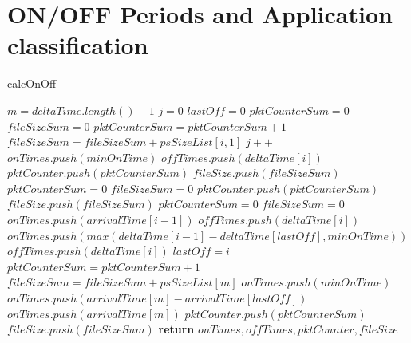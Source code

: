 \section{ON/OFF Periods and Application classification}

    
\begin{algorithm}[ht!]
    \caption{calcOnOff}
    \label{alg:calcOnOff}
    \begin{algorithmic}[1]
        \small
        \State $m = deltaTime.length() - 1$
        \State $j = 0$
        \State $lastOff = 0$
        \State $pktCounterSum = 0$
        \State $fileSizeSum = 0$
        \State $pktCounterSum = pktCounterSum + 1$
        \State $fileSizeSum = fileSizeSum + psSizeList[i, 1]$
         
        \State $j++$
        \State $onTimes.push(minOnTime)$
        \State $offTimes.push(deltaTime[i])$
        \State $pktCounter.push(pktCounterSum)$
        \State $fileSize.push(fileSizeSum)$
        \State $pktCounterSum = 0$
        \State $fileSizeSum = 0$
        \Else {} 
        \State $pktCounter.push(pktCounterSum)$
        \State $fileSize.push(fileSizeSum)$
        \State $pktCounterSum = 0$
        \State $fileSizeSum = 0$
        \State $onTimes.push(arrivalTime[i - 1])$
        \State $offTimes.push(deltaTime[i])$
        \Else {} 
        \State  $onTimes.push(max(deltaTime[i-1] - deltaTime[lastOff], minOnTime))$ 
        \State  $offTimes.push(deltaTime[i])$
        \EndIf
        \State $lastOff = i$
        \EndIf 
        \EndIf       
        \EndFor
        \State $pktCounterSum = pktCounterSum + 1$
        \State $fileSizeSum = fileSizeSum + psSizeList[m]$
         
        \State $onTimes.push(minOnTime)$ %
        \Else {}
        \State $onTimes.push(arrivalTime[m] - arrivalTime[lastOff])$ 
        \Else 
        \State $onTimes.push(arrivalTime[m])$ 
        \EndIf
        \EndIf
        \State $pktCounter.push(pktCounterSum)$
        \State $fileSize.push(fileSizeSum)$
        \State \textbf{return} $onTimes, offTimes, pktCounter, fileSize$
        \EndFunction
    \end{algorithmic}
\end{algorithm}
    
